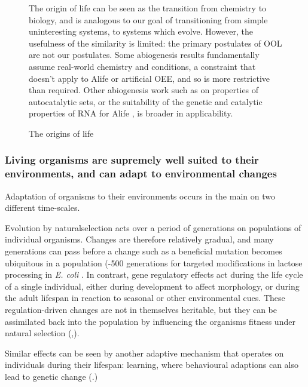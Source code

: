 \begin{figure}
\begin{framed}
The origin of life can be seen as the transition from chemistry to biology, and is analogous to our goal of transitioning from simple uninteresting systems, to systems which evolve. However, the usefulness of the similarity is limited: the primary postulates of OOL are not our postulates. Some abiogenesis results fundamentally assume real-world chemistry and
conditions, a constraint that doesn't apply to Alife or artificial OEE, and so is more restrictive than required. Other abiogenesis work such as on properties of autocatalytic sets, or the suitability of the genetic and catalytic properties of RNA for Alife \autocite{Cheng2010}, is broader in applicability.
\end{framed}
\captionsetup{name=Box}
\caption{The origins of life}
\label{box:ool}
\end{figure}

\subsubsection{Living organisms are supremely well suited to their environments, and can adapt to environmental changes}
\label{living-organisms-are-supremely-well-suited-to-their-environments-and-can-adapt-to-environmental-changes}

Adaptation of organisms to their environments occurs in the main on two
different time-scales.

Evolution by \gls{naturalselection} acts over a period of generations on populations of individual organisms. Changes are therefore relatively gradual, and many generations can pass before a change such as a beneficial mutation becomes ubiquitous in a population (-500 generations for targeted modifications in lactose processing in \emph{E. coli} \autocite{Dekel:2005fk}. In contrast, gene regulatory effects act during the life cycle of a single individual, either during development to affect morphology, or during the adult lifespan in reaction to seasonal or other environmental cues. These regulation-driven changes are not in themselves heritable, but they can be assimilated back into the population by influencing the organisms fitness under natural selection (\eg,\autocite{Baldwin:1896ly,Dennett:2003ve,Paenke:2009xe,Paenke:2007ve}).

Similar effects can be seen by another adaptive mechanism that operates on individuals during their lifespan: learning, where behavioural adaptions can also lead to genetic change (\eg \autocite{Hinton:1987vy}.)

